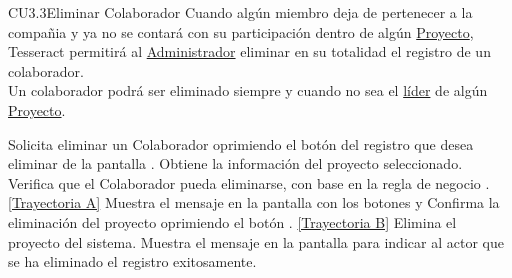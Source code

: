 	\begin{UseCase}{CU3.3}{Eliminar Colaborador}{
			Cuando algún miembro deja de pertenecer a la compañia y ya no se contará con su participación dentro de algún \hyperlink{proyectoEntidad}{Proyecto}, Tesseract permitirá al {\hyperlink{admin}{Administrador}} eliminar en su totalidad el registro de un colaborador. \\
			Un colaborador podrá ser eliminado siempre y cuando no sea el {\hyperlink{jefe}{líder}} de algún \hyperlink{proyectoEntidad}{Proyecto}.
	}
	\end{UseCase}
	\begin{UCtrayectoria}
		\UCpaso[\UCactor] Solicita eliminar un Colaborador oprimiendo el botón \eliminar del registro que desea eliminar de la pantalla .
		\UCpaso[\UCsist] Obtiene la información del proyecto seleccionado.
		\UCpaso[\UCsist] Verifica que el Colaborador pueda eliminarse, con base en la regla de negocio . \hyperlink{CU3-3:TAA}{[Trayectoria A]}
		\UCpaso[\UCsist] Muestra el mensaje  en la pantalla  con los botones  y 
		\UCpaso[\UCsist] Confirma la eliminación del proyecto oprimiendo el botón . \hyperlink{CU3-3:TAB}{[Trayectoria B]}
		\UCpaso[\UCsist] Elimina el proyecto del sistema.
		\UCpaso[\UCsist] Muestra el mensaje  en la pantalla  para indicar al actor que se ha eliminado el registro exitosamente.
	\end{UCtrayectoria}		
